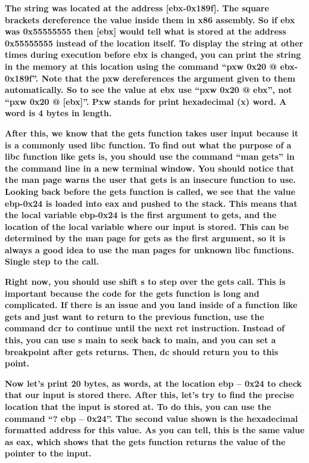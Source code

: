 \textbf{The string was located at the address [ebx-0x189f]. The square brackets dereference the value inside them in x86
assembly. So if ebx was 0x55555555 then [ebx] would tell what is stored at the address 0x55555555 instead of the
location itself. To display the string at other times during execution before ebx is changed, you can print the string
in the memory at this location using the command ``pxw 0x20 @ ebx-0x189f''. Note that the pxw dereferences the argument
given to them automatically. So to see the value at ebx use ``pxw 0x20 @ ebx'', not ``pxw 0x20 @ [ebx]''. Pxw stands
for print hexadecimal (x) word. A word is 4 bytes in length. }

  
 

\textbf{After this, we know that the gets function takes user input because it is a commonly used libc function. To find
out what the purpose of a libc function like gets is, you should use the command ``man gets'' in the command line in a
new terminal window. You should notice that the man page warns the user that gets is an insecure function to use.
Looking back before the gets function is called, we see that the value ebp-0x24 is loaded into eax and pushed to the
stack. This means that the local variable ebp-0x24 is the first argument to gets, and the location of the local
variable where our input is stored. This can be determined by the man page for gets as the first argument, so it is
always a good idea to use the man pages for unknown libc functions. Single step to the call.}

  
 

  
 

\textbf{Right now, you should use shift s to step over the gets call. This is important because the code for the gets
function is long and complicated. If there is an issue and you land inside of a function like gets and just want to
return to the previous function, use the command dcr to continue until the next ret instruction. Instead of this, you
can use s main to seek back to main, and you can set a breakpoint after gets returns. Then, dc should return you to
this point.}

\textbf{Now let's print 20 bytes, as words, at the location ebp -- 0x24 to check that our input is stored there. After
this, let's try to find the precise location that the input is stored at. To do this, you can use the command ``? ebp
-- 0x24''. The second value shown is the hexadecimal formatted address for this value. As you can tell, this is the
same value as eax, which shows that the gets function returns the value of the pointer to the input.}

